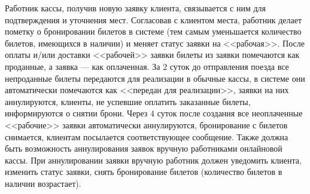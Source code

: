 \documentclass[11pt,a4paper,twoside,listtotoc,bibtotoc]{report}
\numberwithin{equation}{section}
\theoremstyle{definition}
\theoremstyle{plain}
\begin{document}
Работник кассы, получив новую заявку клиента, связывается с ним для подтверждения
и уточнения мест. Согласовав с клиентом места, работник делает пометку о бронировании
билетов в системе (тем самым уменьшается количество билетов, имеющихся в наличии)
и меняет статус заявки на <<рабочая>>. После оплаты и/или доставки <<рабочей>> заявки
билеты из заявки помечаются как проданные, а заявка --- как оплаченная. За $2$ суток
до отправления поезда все непроданные билеты передаются для реализации в обычные
кассы, в системе они автоматически помечаются как <<передан для реализации>>,
заявки на них аннулируются, клиенты, не успевшие оплатить заказанные билеты,
информируются о снятии брони. Через $4$ суток после создания все неоплаченные <<рабочие>>
заявки автоматически аннулируются, бронирование с билетов снимается, клиентам
посылается соответствующее сообщение. Также должна быть возможность аннулирования
заявок вручную работниками онлайновой кассы. При аннулировании заявки вручную работник
должен уведомить клиента, изменить статус заявки, снять бронирование билетов
(количество билетов в наличии возрастает).

%
\newpage
%
%
\end{document}
